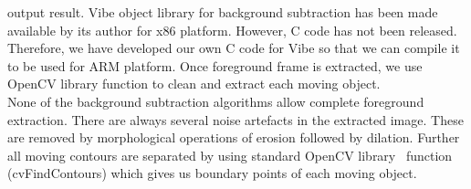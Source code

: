 \documentclass[conference]{IEEEtran}
\begin{document}
output result. Vibe object library for background subtraction has been
made available by its author for x86 platform. However, C code has not
been released. Therefore, we have developed our own C code for Vibe so
that we can compile it to be used for ARM platform. Once foreground
frame is extracted, we use OpenCV library function to clean and extract
each moving object.\\
\indent None of the background subtraction algorithms allow complete
foreground extraction. There are always several noise artefacts in the
extracted image. These are removed by morphological operations of
erosion followed by dilation. Further all moving contours are separated
by using standard OpenCV library~\cite{12} function (cvFindContours)
which gives us boundary points of each moving object.\\
\end{document}
